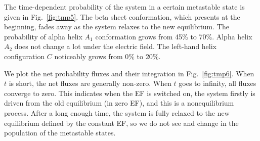 \documentclass[aip,jcp,a4paper,preprint,onecolumn]{revtex4-1}
\begin{document}
The time-dependent probability of the system in a certain metastable state is given in
Fig.~\ref{fig:tmp5}. The beta sheet conformation,
which presents at the beginning,
fades away as the system relaxes to the new equilibrium. The
probability of alpha helix $A_1$ conformation grows from 45\% to 70\%.
Alpha helix $A_2$  does not change a lot under the electric field.
The left-hand helix configuration $C$ noticeably grows from 0\% to 20\%.

We plot the net probability fluxes and their integration in Fig.~\ref{fig:tmp6}.
When $t$ is short, the net fluxes are generally non-zero.
When $t$ goes to infinity,
all fluxes converge to zero. This indicates
when the EF is switched on, the system firstly is driven from the old
equilibrium (in zero EF), and this is a nonequilibrium process.
After a long enough time, the system
is fully relaxed to the new equilibrium defined by the constant EF,
so we do not see and change
in the population of the metastable states.
\end{document}

